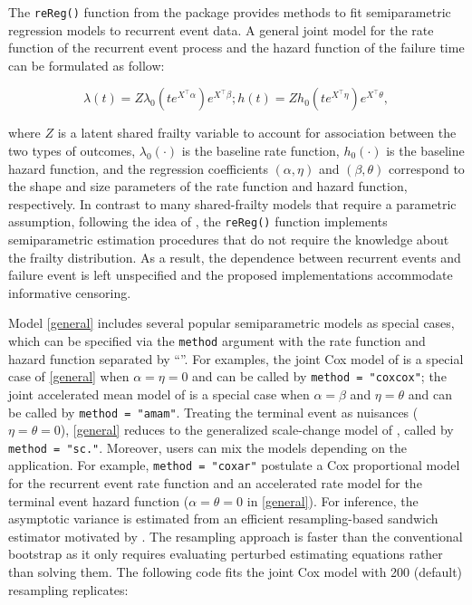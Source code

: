 The \texttt{reReg()} function from the  package provides
methods to fit semiparametric regression models to recurrent event data.
A general joint model for the rate function of the recurrent event
process and the hazard function of the failure time can be formulated as
follow: \vspace*{-.5cm}

\begin{equation}
\lambda(t) = Z \lambda_0(te^{X^\top\alpha})e^{X^\top\beta};
h(t) = Z h_0(te^{X^\top\eta})e^{X^\top\theta},
\label{general}
\end{equation}

\vspace*{-.1cm}

where \(Z\) is a latent shared frailty variable to account for
association between the two types of outcomes, \(\lambda_0(\cdot)\) is
the baseline rate function, \(h_0(\cdot)\) is the baseline hazard
function, and the regression coefficients \((\alpha, \eta)\) and
\((\beta, \theta)\) correspond to the shape and size parameters of the
rate function and hazard function, respectively. In contrast to many
shared-frailty models that require a parametric assumption, following
the idea of \citet{wang2001analyzing}, the \texttt{reReg()} function
implements semiparametric estimation procedures that do not require the
knowledge about the frailty distribution. As a result, the dependence
between recurrent events and failure event is left unspecified and the
proposed implementations accommodate informative censoring.

Model \eqref{general} includes several popular semiparametric models as
special cases, which can be specified via the \texttt{method} argument
with the rate function and hazard function separated by
``\texttt{\textbar{}}''. For examples, the joint Cox model of
\citet{huang2004joint} is a special case of \eqref{general} when
\(\alpha = \eta = 0\) and can be called by
\texttt{method\ =\ "cox\textbar{}cox"}; the joint accelerated mean model
of \citet{xu2017joint} is a special case when \(\alpha = \beta\) and
\(\eta = \theta\) and can be called by
\texttt{method\ =\ "am\textbar{}am"}. Treating the terminal event as
nuisances (\(\eta = \theta = 0\)), \eqref{general} reduces to the
generalized scale-change model of \citet{xu2019generalized}, called by
\texttt{method\ =\ "sc\textbar{}."}. Moreover, users can mix the models
depending on the application. For example,
\texttt{method\ =\ "cox\textbar{}ar"} postulate a Cox proportional model
for the recurrent event rate function and an accelerated rate model for
the terminal event hazard function (\(\alpha = \theta = 0\) in
\eqref{general}). For inference, the asymptotic variance is estimated
from an efficient resampling-based sandwich estimator motivated by
\citet{zeng2008efficient}. The resampling approach is faster than the
conventional bootstrap as it only requires evaluating perturbed
estimating equations rather than solving them. The following code fits
the joint Cox model with 200 (default) resampling replicates:

